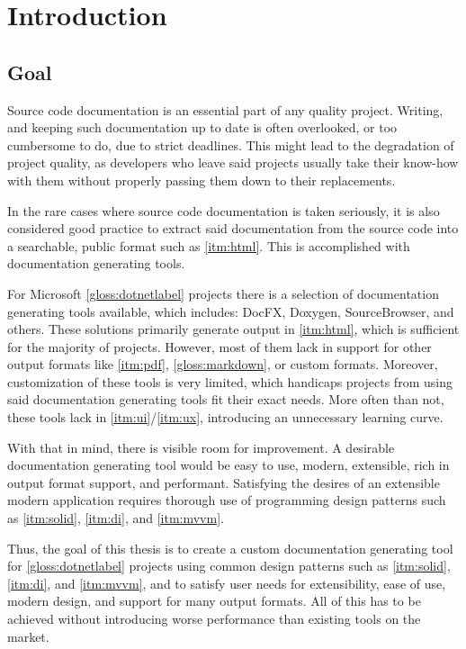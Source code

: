 \chapter*{Introduction}

\section*{Goal}

Source code documentation is an essential part of any quality project. Writing, and keeping such documentation up to date is often overlooked, or too cumbersome to do, due to strict deadlines. This might lead to the degradation of project quality, as developers who leave said projects usually take their know-how with them without properly passing them down to their replacements.

In the rare cases where source code documentation is taken seriously, it is also considered good practice to extract said documentation from the source code into a searchable, public format such as \ref{itm:html}. This is accomplished with documentation generating tools.

For Microsoft \ref{gloss:dotnetlabel} projects there is a selection of documentation generating tools available, which includes: DocFX, Doxygen, SourceBrowser, and others. These solutions primarily generate output in \ref{itm:html}, which is sufficient for the majority of projects. However, most of them lack in support for other output formats like \ref{itm:pdf}, \ref{gloss:markdown}, or custom formats. Moreover, customization of these tools is very limited, which handicaps projects from using said documentation generating tools fit their exact needs. More often than not, these tools lack in \ref{itm:ui}/\ref{itm:ux}, introducing an unnecessary learning curve.

With that in mind, there is visible room for improvement. A desirable documentation generating tool would be easy to use, modern, extensible, rich in output format support, and performant. Satisfying the desires of an extensible modern application requires thorough use of programming design patterns such as \ref{itm:solid}, \ref{itm:di}, and \ref{itm:mvvm}.

Thus, the goal of this thesis is to create a custom documentation generating tool for \ref{gloss:dotnetlabel} projects using common design patterns such as \ref{itm:solid}, \ref{itm:di}, and \ref{itm:mvvm}, and to satisfy user needs for extensibility, ease of use, modern design, and support for many output formats. All of this has to be achieved without introducing worse performance than existing tools on the market.

